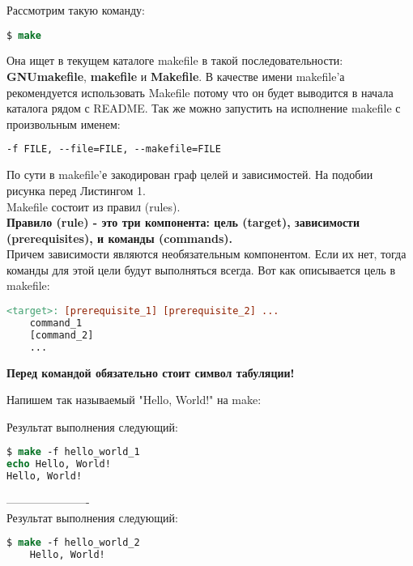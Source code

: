 Рассмотрим такую команду: \\

\begin{lstlisting}[language=csh]
$ make
\end{lstlisting}

Она ищет в текущем каталоге makefile в такой последовательности: \textbf{GNUmakefile}, \textbf{makefile} и \textbf{Makefile}. В качестве имени makefile'а рекомендуется использовать Makefile потому что он будет выводится в начала каталога рядом с README. Так же можно запустить на исполнение makefile с произвольным именем:

\begin{lstlisting}[language=csh]
-f FILE, --file=FILE, --makefile=FILE
\end{lstlisting}

По сути в makefile'е закодирован граф целей и зависимостей. На подобии рисунка перед Листингом 1. \\
Makefile состоит из правил (rules). \\
\textbf{Правило (rule) - это три компонента: цель (target), зависимости (prerequisites), и команды (commands).}\\
Причем зависимости являются необязательным компонентом. Если их нет, тогда команды для этой цели будут выполняться всегда. Вот как описывается цель в makefile:

\begin{lstlisting}[language=make]
<target>: [prerequisite_1] [prerequisite_2] ...
	command_1
	[command_2]
	...
\end{lstlisting}

\textbf{Перед командой обязательно стоит символ табуляции!}

Напишем так называемый "Hello, World!" на make:


Результат выполнения следующий:

\begin{lstlisting}[language=csh]
$ make -f hello_world_1
echo Hello, World!
Hello, World!
\end{lstlisting}

---------------------- \\



Результат выполнения следующий:

\begin{lstlisting}[language=csh]
	$ make -f hello_world_2
	Hello, World!
\end{lstlisting}


